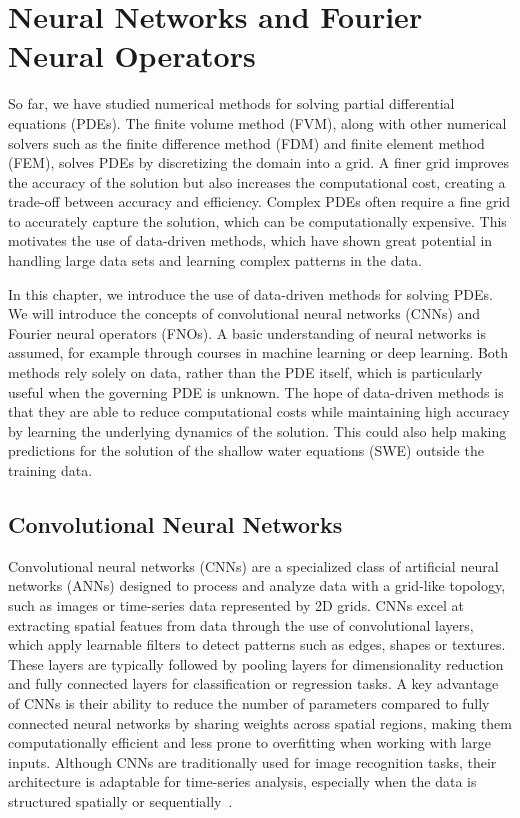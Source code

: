 \chapter{Neural Networks and Fourier Neural Operators}\label{ch:FNO+NN}
So far, we have studied numerical methods for solving partial differential equations (PDEs).
The finite volume method (FVM), along with other numerical solvers such as the finite difference method (FDM) and finite element method (FEM), solves PDEs by discretizing the domain into a grid.
A finer grid improves the accuracy of the solution but also increases the computational cost, creating a trade-off between accuracy and efficiency.
Complex PDEs often require a fine grid to accurately capture the solution, which can be computationally expensive.
This motivates the use of data-driven methods, which have shown great potential in handling large data sets and learning complex patterns in the data.

In this chapter, we introduce the use of data-driven methods for solving PDEs.
We will introduce the concepts of convolutional neural networks (CNNs) and Fourier neural operators (FNOs).
A basic understanding of neural networks is assumed, for example through courses in machine learning or deep learning.
Both methods rely solely on data, rather than the PDE itself, which is particularly useful when the governing PDE is unknown.
The hope of data-driven methods is that they are able to reduce computational costs while maintaining high accuracy by learning the underlying dynamics of the solution.
This could also help making predictions for the solution of the shallow water equations (SWE) outside the training data.


\section{Convolutional Neural Networks}
Convolutional neural networks (CNNs) are a specialized class of artificial neural networks (ANNs) designed to process and analyze data with a grid-like topology, such as images or time-series data represented by 2D grids.
CNNs excel at extracting spatial featues from data through the use of convolutional layers, which apply learnable filters to detect patterns such as edges, shapes or textures.
These layers are typically followed by pooling layers for dimensionality reduction and fully connected layers for classification or regression tasks.
A key advantage of CNNs is their ability to reduce the number of parameters compared to fully connected neural networks by sharing weights across spatial regions, making them computationally efficient and less prone to overfitting when working with large inputs.
Although CNNs are traditionally used for image recognition tasks, their architecture is adaptable for time-series analysis, especially when the data is structured spatially or sequentially~\cite{chollet2017comprehensive}.

